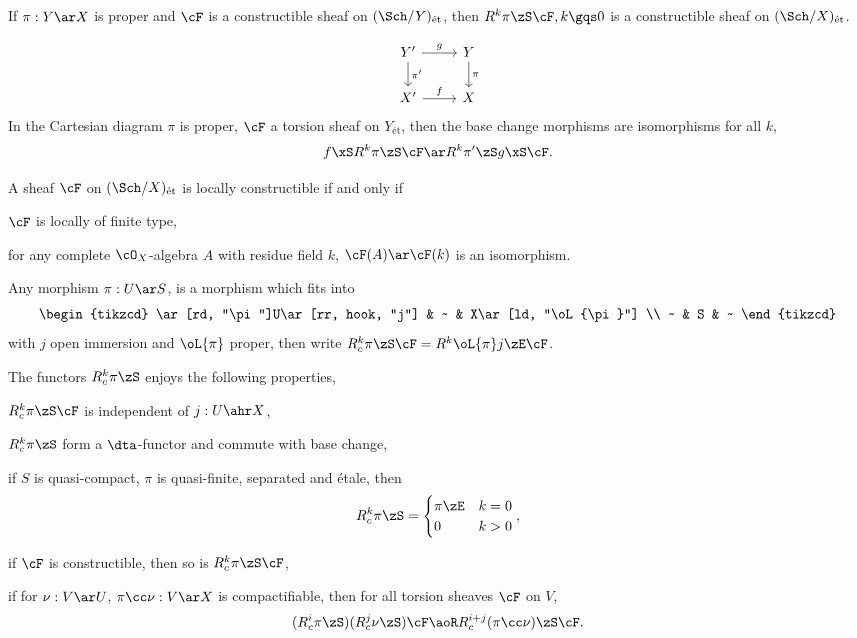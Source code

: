 \documentclass[a4paper, twoside]{article}
\begin{document}
\begin{thm}[Finiteness]
  If $\pi:Y\ar X$ is proper and $\cF$ is a constructible sheaf on $(\Sch/Y)_{\text{{\'e}t}}$, then $R^{k}\pi\zS\cF, k\gqs0$ is a constructible sheaf on $(\Sch/X)_{\text{{\'e}t}}$.
\end{thm}

\begin{thm}
  \[
    \begin{tikzcd}
      Y'\ar[r, "g"]\ar[d, "\pi'"] & Y\ar[d, "\pi"] \\
      X'\ar[r, "f"] & X
    \end{tikzcd}
  \]
  In the Cartesian diagram $\pi$ is proper, $\cF$ a torsion sheaf on $Y_{\text{{\'e}t}}$, then the base change morphisms are isomorphisms for all $k$,
  \[
    f\xS R^{k}\pi\zS\cF\ar R^{k}\pi'\zS g\xS\cF.
  \]
\end{thm}

\begin{thm}
  A sheaf $\cF$ on $(\Sch/X)_{\text{{\'e}t}}$ is locally constructible if and only if
  \begin{enr}
    \item $\cF$ is locally of finite type,
    \item for any complete $\cO_{X}$-algebra $A$ with residue field $k$, $\cF(A)\ar\cF(k)$ is an isomorphism.
  \end{enr}
\end{thm}

\begin{dfn}
  Any  morphism $\pi:U\ar S$, is a morphism which fits into
  \[
    \begin{tikzcd}
      \ar[rd, "\pi"]U\ar[rr, hook, "j"] & ~ & X\ar[ld, "\oL{\pi}"] \\
      ~ & S & ~
    \end{tikzcd}
  \]
  with $j$ open immersion and $\oL{\pi}$ proper, then write $R_{c}^{k}\pi\zS\cF=R^{k}\oL{\pi}j\zE\cF$.
\end{dfn}

\begin{thm}
  The functors $R_{c}^{k}\pi\zS$ enjoys the following properties,
  \begin{enr}
    \item $R_{c}^{k}\pi\zS\cF$ is independent of $j:U\ahr X$,
    \item $R_{c}^{k}\pi\zS$ form a $\dta$-functor and commute with base change,
    \item if $S$ is quasi-compact, $\pi$ is quasi-finite, separated and {\'e}tale, then
    \[
      R_{c}^{k}\pi\zS=\begin{cases}
        \pi\zE & k=0 \\
        0 & k>0
      \end{cases},
    \]
    \item if $\cF$ is constructible, then so is $R_{c}^{k}\pi\zS\cF$,
    \item if for $\nu:V\ar U$, $\pi\cc\nu:V\ar X$ is compactifiable, then for all torsion sheaves $\cF$ on $V$,
    \[
      (R_{c}^{i}\pi\zS)(R_{c}^{j}\nu\zS)\cF\aoR R_{c}^{i+j}(\pi\cc\nu)\zS\cF.
    \]
  \end{enr}
\end{thm}
\end{document}

